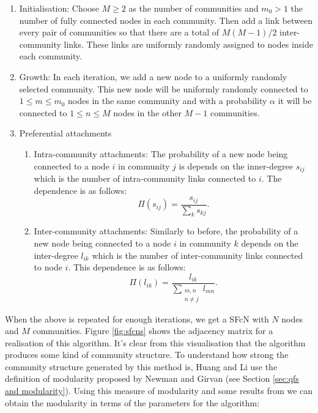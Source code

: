 \begin{enumerate}
    \item Initialisation: Choose $M \geq 2$ as the number of communities and $m_0 > 1$ the number of fully connected nodes in each community. Then add a link between every pair of communities so that there are a total of $M(M-1)/2$ inter-community links. These links are uniformly randomly assigned to nodes inside each community. \\
    \item Growth: In each iteration, we add a new node to a uniformly randomly selected community. This new node will be uniformly randomly connected to $1 \leq m \leq m_0$ nodes in the same community and with a probability $\alpha$ it will be connected to $1 \leq n \leq M$ nodes in the other $M - 1$ communities. \\
    \item Preferential attachments
    \begin{enumerate}
        \item Intra-community attachments: The probability of a new node being connected to a node $i$ in community $j$ is depends on the inner-degree $s_{ij}$ which is the number of intra-community links connected to $i$. The dependence is as follows:
            $$ \Pi(s_{ij}) = \frac{s_{ij}}{\sum_ks_{kj}}. $$
        \item Inter-community attachments: Similarly to before, the probability of a new node being connected to a node $i$ in community $k$ depends on the inter-degree $l_{ik}$ which is the number of inter-community links connected to node $i$. This dependence is as follows:
            $$ \Pi(l_{ik}) = \frac{l_{ik}}{\sum_{\substack{m, n \\ n \not = j}} l_{mn}}. $$
    \end{enumerate}
\end{enumerate}

When the above is repeated for enough iterations, we get a SFcN with $N$ nodes and $M$ communities. Figure \ref{fig:sfcns} shows the adjacency matrix for a realisation of this algorithm. It's clear from this visualisation that the algorithm produces some kind of community structure. To understand how strong the community structure generated by this method is, Huang and Li use the definition of modularity proposed by Newman and Girvan (see Section \ref{sec:qfs and modularity}). Using this measure of modularity and some results from \cite{Li_2005} we can obtain the modularity in terms of the parameters for the algorithm:

